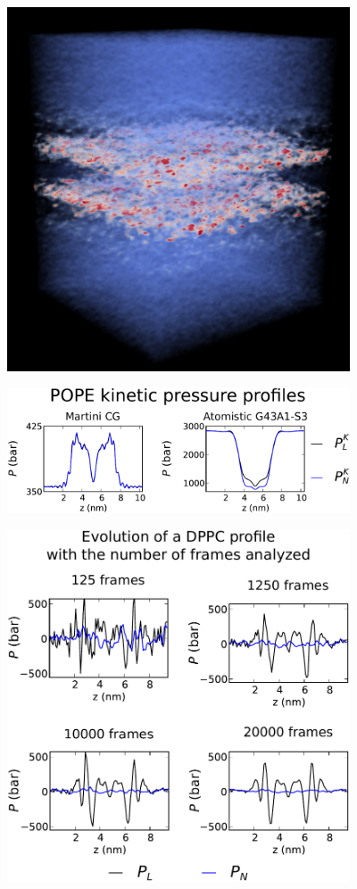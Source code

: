 \documentclass[10pt,letterpaper,notitlepage]{article}
\begin{document}
\begin{figure}
\centering
\includegraphics[width=4in]{figs/3D_stress_black_bw.pdf}
\caption{}
\end{figure}

\begin{figure}
\centering
\includegraphics[width=4in]{figs/kin.pdf}
\caption{}
\end{figure}



\begin{figure}[h]
\centering
\includegraphics[width=4in]{figs/evol.pdf}
\caption{}
\end{figure}
\end{document}
